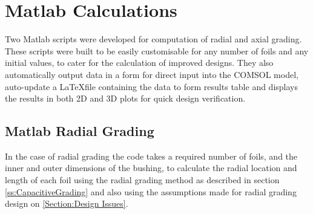 \section{Matlab Calculations}
Two Matlab scripts were developed for computation of radial and axial grading. 
These scripts were built to be easily customisable for any number of foils and any initial values, to cater for the calculation of improved designs. 
They also automatically output data in a form for direct input into the COMSOL model, auto-update a \LaTeX  file containing the data to form results table and displays the results in both 2D and 3D plots for quick design verification.

\subsection{Matlab Radial Grading}
In the case of radial grading the code takes a required number of foils, and the inner and outer dimensions of the bushing, to calculate the radial location and length of each foil using the radial grading method as described in section \ref{ss:CapacitiveGrading} and also using the assumptions made for radial grading design on \ref{Section:Design Issues}. 


